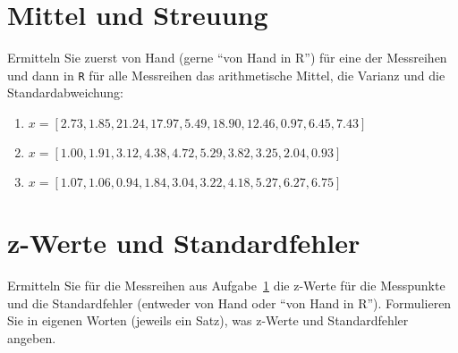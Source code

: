 \newpage

\section{Mittel und Streuung}
\label{sec:mittelstreu}

Ermitteln Sie zuerst von Hand (gerne "`von Hand in R"') für eine der Messreihen und dann in \texttt{R} für alle Messreihen das arithmetische Mittel, die Varianz und die Standardabweichung:

\begin{enumerate}
  \item $x=[2.73, 1.85, 21.24, 17.97, 5.49, 18.90, 12.46, 0.97, 6.45, 7.43]$
  \item $x=[1.00, 1.91, 3.12, 4.38, 4.72, 5.29, 3.82, 3.25, 2.04, 0.93]$
  \item $x=[1.07, 1.06, 0.94, 1.84, 3.04, 3.22, 4.18, 5.27, 6.27, 6.75]$
\end{enumerate}

\section{z-Werte und Standardfehler}

Ermitteln Sie für die Messreihen aus Aufgabe~\ref{sec:mittelstreu} die z-Werte für die Messpunkte und die Standardfehler (entweder von Hand oder "`von Hand in R"').
Formulieren Sie in eigenen Worten (jeweils ein Satz), was z-Werte und Standardfehler angeben.

% 

